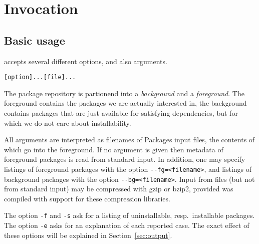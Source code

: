 
\section{Invocation}
\label{sec:invocation}

\subsection{Basic usage}

\debcheck{} accepts several different options, and also arguments.

\begin{alltt}
  \debcheck{} [option] ... [file] ...
\end{alltt}

The package repository is partionend into a \emph{background} and a
\emph{foreground}. The foreground contains the packages we are actually
interested in, the background contains packages that are just available
for satisfying dependencies, but for which we do not care about installability.

All arguments are interpreted as filenames of Packages input files,
the contents of which go into the foreground. If no argument is given
then metadata of foreground packages is read from standard input.  In
addition, one may specify listings of foreground packages with the
option \verb|--fg=<filename>|, and listings of background packages
with the option \verb|--bg=<filename>|. Input from files (but not from
standard input) may be compressed with gzip or bzip2, provided
\debcheck{} was compiled with support for these compression libraries.

The option \texttt{-f} and \texttt{-s} ask for a listing of uninstallable,
resp.\ installable packages. The option \texttt{-e} asks for an explanation
of each reported case. The exact effect of these options will be explained
in Section~\ref{sec:output}.

